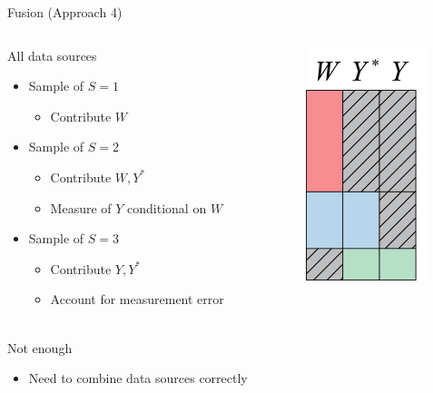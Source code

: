 \documentclass{beamer}
\begin{document}
\begin{frame}{Fusion (Approach 4)}
	\begin{minipage}[0.2\textheight]{\textwidth}
		\begin{columns}[T]
			\begin{column}{0.6\textwidth}
				All data sources
				\begin{itemize}
					\item Sample of $S=1$
					\begin{itemize}
						\item Contribute $W$
					\end{itemize}
					\item Sample of $S=2$
					\begin{itemize}
						\item Contribute $W,Y^*$
						\item Measure of $Y$ conditional on $W$
					\end{itemize}
					\item Sample of $S=3$
					\begin{itemize}
						\item Contribute $Y,Y^*$
						\item Account for measurement error
					\end{itemize}
				\end{itemize}~\\
				Not enough
				\begin{itemize}
					\item Need to combine data sources correctly
				\end{itemize}	
			\end{column}
			\begin{column}{0.35\textwidth}
				\includegraphics[width=3.5cm]{images/data_sources4.png}
			\end{column}
		\end{columns}
	\end{minipage}	
\end{frame}
\end{document}
